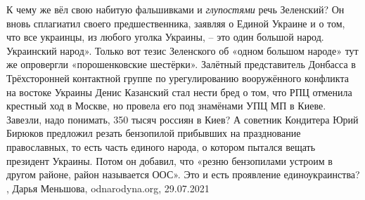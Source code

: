 К чему же вёл свою набитую фальшивками и \emph{глупостями} речь Зеленский? Он вновь
сплагиатил своего предшественника, заявляя о Единой Украине и о том, что все
украинцы, из любого уголка Украины, – это один большой народ. Украинский
народ».  Только вот тезис Зеленского об «одном большом народе» тут же
опровергли «порошенковские шестёрки». Залётный представитель Донбасса в
Трёхсторонней контактной группе по урегулированию вооружённого конфликта на
востоке Украины Денис Казанский стал нести бред о том, что РПЦ отменила
крестный ход в Москве, но провела его под знамёнами УПЦ МП в Киеве. Завезли,
надо понимать, 350 тысяч россиян в Киев?  А советник Кондитера Юрий Бирюков
предложил резать бензопилой прибывших на празднование православных, то есть
часть единого народа, о котором пытался вещать президент Украины. Потом он
добавил, что «резню бензопилами устроим в другом районе, район называется ООС».
Это и есть проявление единоукраинства?
, 
Дарья Меньшова, odnarodyna.org, 29.07.2021
